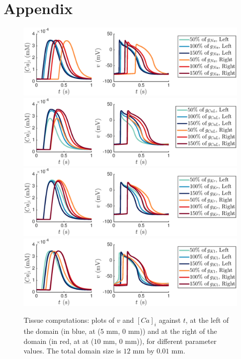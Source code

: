 \documentclass[12pt,a4paper]{article}
\begin{document}
\section*{Appendix} \label{Appendix}
%
\begin{figure}
   \includegraphics[trim=3cm 0cm 4cm 0cm, clip=true, width=1\linewidth]{strip_gna} 
   \includegraphics[trim=3cm 0cm 4cm 0cm, clip=true, width=1\linewidth]{strip_gcal} 
      \includegraphics[trim=3cm 0cm 4cm 0cm, clip=true, width=1\linewidth]{strip_gkr} 
         \includegraphics[trim=3cm 0cm 4cm 0cm, clip=true, width=1\linewidth]{strip_gk1} 
    \caption{Tissue computations: plots of $v$ and $[Ca]_i$ against $t$, at the left of the domain (in blue, at ($5$ mm, $0$ mm)) and at the right of the domain (in red, at at ($10$ mm, $0$ mm)), for different parameter values. The total domain size is $12$ mm by $0.01$ mm.}
    \label{fig:4}
\end{figure}
\end{document}
